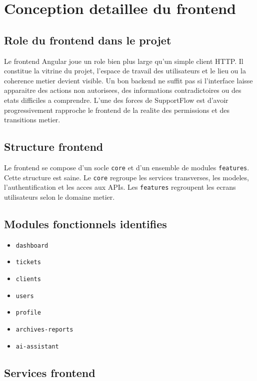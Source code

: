 \documentclass[12pt,a4paper,oneside]{report}
\begin{document}
\chapter{Conception detaillee du frontend}

\section{Role du frontend dans le projet}

Le frontend Angular joue un role bien plus large qu'un simple client HTTP. Il constitue la vitrine du projet, l'espace de travail des utilisateurs et le lieu ou la coherence metier devient visible. Un bon backend ne suffit pas si l'interface laisse apparaitre des actions non autorisees, des informations contradictoires ou des etats difficiles a comprendre. L'une des forces de SupportFlow est d'avoir progressivement rapproche le frontend de la realite des permissions et des transitions metier.

\section{Structure frontend}

Le frontend se compose d'un socle \texttt{core} et d'un ensemble de modules \texttt{features}. Cette structure est saine. Le \texttt{core} regroupe les services transverses, les modeles, l'authentification et les acces aux APIs. Les \texttt{features} regroupent les ecrans utilisateurs selon le domaine metier.

\section{Modules fonctionnels identifies}

\begin{itemize}[leftmargin=1.2cm]
  \item \texttt{dashboard}
  \item \texttt{tickets}
  \item \texttt{clients}
  \item \texttt{users}
  \item \texttt{profile}
  \item \texttt{archives-reports}
  \item \texttt{ai-assistant}
\end{itemize}

\section{Services frontend}
\end{document}
